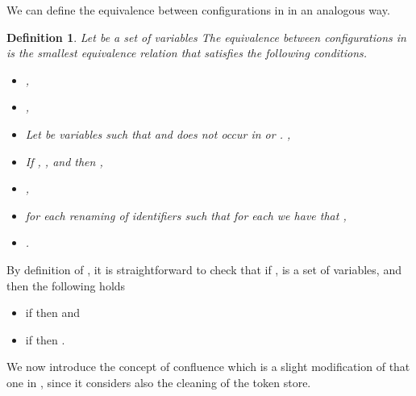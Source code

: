 \documentclass{tlp}
\newtheorem{definition}{Definition} \newtheorem{proposition}{Proposition} \newtheorem{example}{Example} \newtheorem{corollary}{Corollary} \newtheorem{theorem}{Theorem} \newtheorem{lemma}{Lemma}
\begin{document}
We can define the equivalence  between configurations in  in an analogous way.
\begin{definition}\label{def:n1altraeq}
Let  be a set of variables
The equivalence  between configurations in  is the smallest equivalence relation  that satisfies the following conditions.

\begin{itemize}
\item ,

\item ,

\item Let  be variables such that  and  does not occur in  or .
,

\item If , , and
 then
,

\item ,

\item 
for each renaming of identifiers  such that for each 
we have that ,

\item
.
 \end{itemize}
\end{definition}

By definition of , it is straightforward to check that
if ,  is a set of variables, and  then the following holds
\begin{itemize}
\item if  then  and
\item if  then .
\end{itemize}
We now introduce the concept of confluence which is a slight modification of that one in \cite{RBF09}, since it considers also the cleaning of the token store.
\end{document}
